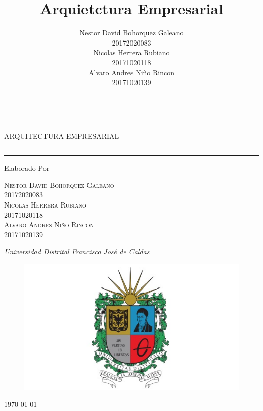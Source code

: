 \documentclass[11pt]{book}
\author{
	Nestor David Bohorquez Galeano \\ 
	20172020083 \\
	Nicolas Herrera Rubiano \\
	20171020118 \\
	Alvaro Andres Niño Rincon \\
	20171020139	
}
\title{Arquietctura Empresarial}
\begin{document}

\begin{titlepage} %
	
	\centering
	\scshape %
	\vspace*{\baselineskip} %
	
	\rule{\textwidth}{1.6pt}\vspace*{-\baselineskip}\vspace*{2pt} %
	\rule{\textwidth}{0.4pt} %
	
	\vspace{0.75\baselineskip}
	
	{\LARGE ARQUITECTURA EMPRESARIAL} %
	
	\vspace{0.75\baselineskip}
	
	\rule{\textwidth}{0.4pt}\vspace*{-\baselineskip}\vspace{3.2pt} %
	\rule{\textwidth}{1.6pt} %
	
	\vspace{2\baselineskip}
	
	\vspace*{3\baselineskip}
	
	Elaborado Por
	
	\vspace{0.5\baselineskip} 
	
	{\scshape\Large Nestor David Bohorquez Galeano \\ 20172020083 \\ 
	Nicolas Herrera Rubiano \\ 20171020118 \\ 
	Alvaro Andres Niño Rincon \\ 20171020139}
	
	\vspace{0.5\baselineskip} 
	
	\textit{Universidad Distrital Francisco José de Caldas}
	
	\vfill 
	
	\begin{figure}[h!]
		\centering
		\includegraphics[width=0.3\linewidth]{imgs/ud.jpeg}
	\end{figure}
	
	\today
\end{titlepage}
\end{document}
